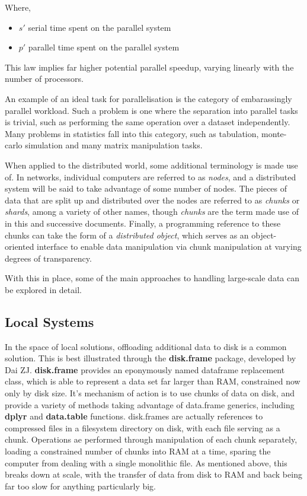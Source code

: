 Where,

\begin{itemize}
        \item \(s'\) serial time spent on the parallel system
        \item \(p'\) parallel time spent on the parallel system
\end{itemize}

This law implies far higher potential parallel speedup, varying linearly with the number of processors.

An example of an ideal task for parallelisation is the category of embarassingly parallel workload.
Such a problem is one where the separation into parallel tasks is trivial, such as performing the same operation over a dataset independently\cite{foster1995parallel}.
Many problems in statistics fall into this category, such as tabulation, monte-carlo simulation and many matrix manipulation tasks.

When applied to the distributed world, some additional terminology is made use of.
In networks, individual computers are referred to as \textit{nodes}, and a distributed system will be said to take advantage of some number of nodes\cite{kleppmann2017dataintensive}.
The pieces of data that are split up and distributed over the nodes are referred to as \textit{chunks} or \textit{shards}, among a variety of other names, though \textit{chunks} are the term made use of in this and successive documents.
Finally, a programming reference to these chunks can take the form of a \textit{distributed object}, which serves as an object-oriented interface to enable data manipulation via chunk manipulation at varying degrees of transparency\cite{emmerich2000engineering}.

With this in place, some of the main approaches to handling large-scale data can be explored in detail.

\subsection{Local Systems}

In the space of local solutions, offloading additional data to disk is a common solution.
This is best illustrated through the \textbf{disk.frame} package, developed by Dai ZJ.
\textbf{disk.frame} provides an eponymously named dataframe replacement class, which is able to represent a data  set far larger than RAM, constrained now only by disk size\cite{zj20}.
It's mechanism of action is to use chunks of data on disk, and provide a variety of methods taking advantage of data.frame generics, including \textbf{dplyr} and \textbf{data.table} functions.
disk.frames are actually references to compressed files in a filesystem directory on disk, with each file serving as a chunk.
Operations ae performed through manipulation of each chunk separately, loading a constrained number of chunks into RAM at a time, sparing the computer from dealing with a single monolithic file\cite{zj19:_inges_data}.
As mentioned above, this breaks down at scale, with the transfer of data from disk to RAM and back being far too slow for anything particularly big.

